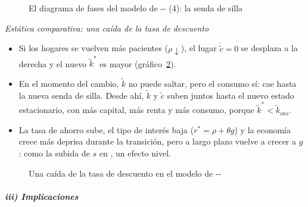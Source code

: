 \documentclass[11pt]{article}
\begin{document}
\begin{figure}[H]
\centering
\caption{El diagrama de fases del modelo de -- (4): la senda de silla}\label{fig:rck-fases}
\end{figure}

\hspace*{3.6em}\emph{Estática comparativa: una caída de la tasa de descuento}

\begin{itemize}
\item Si los hogares se vuelven más pacientes ($\rho\downarrow$), el lugar $\dot{\tilde c}=0$ se desplaza a la derecha y el nuevo $\tilde k^*$ es mayor (gráfico~\ref{fig:rck-rho}).
\item En el momento del cambio, $\tilde k$ no puede saltar, pero el consumo sí: cae hasta la nueva senda de silla. Desde ahí, $\tilde k$ y $\tilde c$ suben juntos hasta el nuevo estado estacionario, con más capital, más renta y más consumo, porque $\tilde k^*<\tilde k_{\mathrm{oro}}$.
\item La tasa de ahorro sube, el tipo de interés baja ($r^*=\rho+\theta g$) y la economía crece más deprisa durante la transición, pero a largo plazo vuelve a crecer a $g$: como la subida de $s$ en , un efecto nivel.
\end{itemize}

\begin{figure}[H]
\centering
\caption{Una caída de la tasa de descuento en el modelo de --}\label{fig:rck-rho}
\end{figure}

\subparagraph{iii) Implicaciones}
\end{document}

